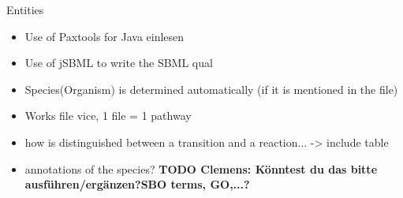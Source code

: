\documentclass{bioinfo}
\begin{document}
\begin{methods}
Entities 

\begin{itemize}
\item Use of Paxtools for Java einlesen
\item Use of jSBML to write the SBML qual
\item Species(Organism) is determined automatically (if it is mentioned in the file)
\item Works file vice, 1 file = 1 pathway
\item how is distinguished between a transition and a reaction... -> include table
\item annotations of the species? \textbf{TODO Clemens: K\"onntest du das bitte ausf\"uhren/erg\"anzen?SBO terms, GO,...?}
\end{itemize}



\end{methods}
\end{document}
